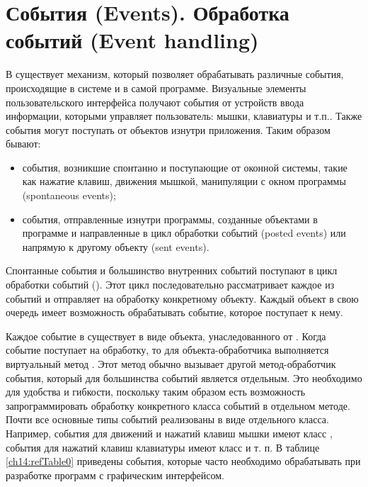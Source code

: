 \section[События (Events). Обработка событий (Event handling)]{События (Events). Обработка событий (Event handling)}
В  существует механизм, который позволяет обрабатывать различные события, происходящие в системе и в самой программе.
Визуальные элементы пользовательского интерфейса получают события от устройств ввода информации, которыми управляет
пользователь: мышки, клавиатуры и т.п.. Также события могут поступать от объектов изнутри приложения.
Таким образом бывают:

\begin{itemize}
\item события, возникшие спонтанно и поступающие от оконной системы, такие как нажатие клавиш, движения мышкой,
манипуляции с окном программы (spontaneous events);
\item события, отправленные изнутри программы, созданные объектами в программе  и направленные в цикл обработки событий
(posted events) или напрямую к другому объекту (sent events).
\end{itemize}
Спонтанные события и большинство внутренних событий поступают в цикл обработки событий
(). Этот цикл последовательно рассматривает каждое из событий и отправляет на обработку конкретному
объекту. Каждый объект в свою очередь имеет возможность обрабатывать событие, которое поступает к нему.

Каждое событие в  существует в виде объекта, унаследованного от . Когда событие
поступает на обработку, то для объекта-обработчика выполняется виртуальный метод . Этот метод
обычно вызывает другой метод-обработчик события, который для большинства событий является отдельным. Это необходимо для
удобства и гибкости, поскольку таким образом есть возможность запрограммировать обработку конкретного класса событий в
отдельном методе. Почти все основные типы событий реализованы в виде отдельного класса. Например, события для движений
и нажатий клавиш мышки имеют класс , события для нажатий клавиш клавиатуры имеют класс
 и т. п. В таблице \ref{ch14:refTable0} приведены события, которые часто необходимо обрабатывать при
разработке программ с графическим интерфейсом.


